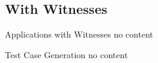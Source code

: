 \subsection{With Witnesses} 

\begin{frame}{Applications with Witnesses}
  no content
\end{frame}


\begin{frame}{Test Case Generation}
  no content
\end{frame}
